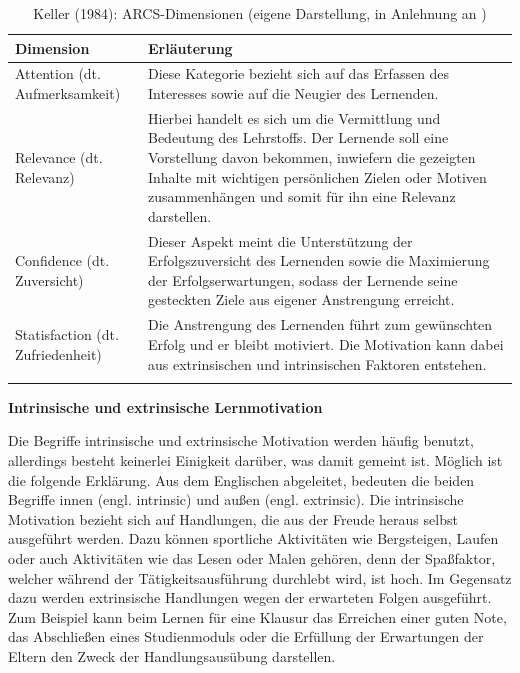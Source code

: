         \begingroup
        \footnotesize    
        \useunder{\uline}{\ul}{}
        \begin{longtable}{|m{5cm}|m{10cm}|}
        \hline     
        \rowcolor[HTML]{EFEFEF}                                         
        \centering \textbf{Dimension} & \centering \arraybackslash \textbf{ Erläuterung} \\ 
        \hline  \hline 
        Attention (dt. Aufmerksamkeit) & Diese Kategorie bezieht sich auf das Erfassen des Interesses sowie auf die Neugier des Lernenden.
         \\ \hline \hline
        
         Relevance (dt. Relevanz) & Hierbei handelt es sich um die Vermittlung und Bedeutung des Lehrstoffs. Der Lernende soll eine Vorstellung davon bekommen, inwiefern die gezeigten 
         Inhalte mit wichtigen persönlichen Zielen oder Motiven zusammenhängen und somit für ihn eine Relevanz darstellen. 
         \\ \hline \hline

         Confidence (dt. Zuversicht) & Dieser Aspekt meint die Unterstützung der Erfolgszuversicht des Lernenden sowie die Maximierung der Erfolgserwartungen, sodass 
         der Lernende seine gesteckten Ziele aus eigener Anstrengung erreicht. 
         \\ \hline \hline

         Statisfaction (dt. Zufriedenheit) & Die Anstrengung des Lernenden führt zum gewünschten Erfolg und er bleibt motiviert.
         Die Motivation kann dabei aus extrinsischen und intrinsischen Faktoren entstehen. 
         \\ \hline \hline


    \caption[Keller (1984): ARCS-Dimensionen]{Keller (1984): ARCS-Dimensionen (eigene Darstellung, in Anlehnung an \parencite[45 f.]{keller_2010})} 
    \label{tab:/ARCS_Dimensionen_Keller} 
    \end{longtable}
    \endgroup  

       \textbf{Intrinsische und extrinsische Lernmotivation}

        Die Begriffe intrinsische und extrinsische Motivation werden häufig benutzt, allerdings besteht keinerlei Einigkeit darüber, was damit gemeint ist. 
        Möglich ist die folgende Erklärung.
        Aus dem Englischen abgeleitet, bedeuten die beiden Begriffe \glqq innen\grqq{} (engl. intrinsic) und \glqq außen\grqq{} (engl. extrinsic). Die intrinsische Motivation bezieht sich 
        auf Handlungen, die aus der Freude heraus selbst ausgeführt werden. 
        Dazu können sportliche Aktivitäten wie Bergsteigen, Laufen oder auch Aktivitäten wie das Lesen oder Malen gehören, denn der
        Spaßfaktor, welcher während der Tätigkeitsausführung durchlebt wird, ist hoch. 
        Im Gegensatz dazu werden extrinsische Handlungen wegen der erwarteten Folgen ausgeführt. Zum Beispiel kann beim Lernen für eine Klausur das Erreichen einer guten Note, das Abschließen eines Studienmoduls
        oder die Erfüllung der Erwartungen der Eltern den Zweck der Handlungsausübung darstellen. \parencite[5 f.]{Zander2018}

